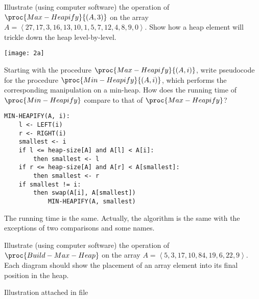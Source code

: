 \documentclass[11pt,addpoints]{exam}
\begin{document}
\begin{questions}
\begin{solutionorbox}
\begin{verbatim}
\end{verbatim}
\end{solutionorbox}
\ifprintanswers
\newpage
\else
\bigskip
\fi


%
\question[10]
Illustrate (using computer software) the operation of $\proc{Max-Heapify}{(A,3)}$ on the array $A = \left< 27, 17, 3, 16, 13, 10, 1, 5, 7, 12, 4, 8, 9, 0\right>$.  Show how a heap element will trickle down the heap level-by-level.

\begin{center}
	\texttt{[image: 2a]}
\end{center}

\ifprintanswers
\newpage
\else
\bigskip
\fi


%
\question[5]
Starting with the procedure $\proc{Max-Heapify}{(A,i)}$, write pseudocode for the procedure $\proc{Min-Heapify}{(A,i)}$, which performs the corresponding manipulation on a min-heap.  How does the running time of $\proc{Min-Heapify}$ compare to that of $\proc{Max-Heapify}$?

\begin{lstlisting}
MIN-HEAPIFY(A, i):
	l <- LEFT(i)
	r <- RIGHT(i)
	smallest <- i
	if l <= heap-size[A] and A[l] < A[i]:
		then smallest <- l
	if r <= heap-size[A] and A[r] < A[smallest]:
		then smallest <- r
	if smallest != i:
		then swap(A[i], A[smallest])
			MIN-HEAPIFY(A, smallest)
\end{lstlisting}
\begin{center}
	The running time is the same. Actually, the algorithm is the same with the exceptions of two comparisons and some names.
\end{center}

\ifprintanswers
\newpage
\else
\bigskip
\fi
	
	
%
\question[10]
Illustrate (using computer software) the operation of $\proc{Build-Max-Heap}$ on the array $A = \left< 5, 3, 17, 10, 84, 19, 6, 22, 9\right>$.  Each diagram should show the placement of an array element into its final position in the heap.  

\begin{center}
	Illustration attached in file
\end{center}


\end{questions}
\end{document}
